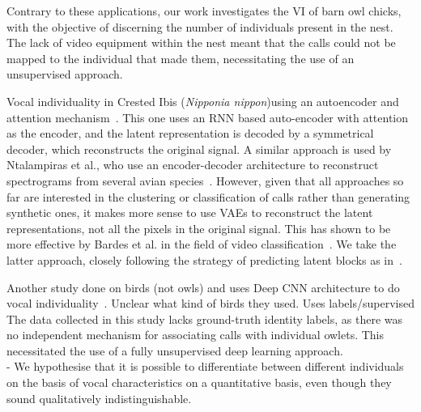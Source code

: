 Contrary to these applications, our work investigates the VI of barn owl chicks, with the objective of discerning the number of individuals present in the nest. The lack of video equipment within the nest meant that the calls could not be mapped to the individual that made them, necessitating the use of an unsupervised approach.

Vocal individuality in Crested Ibis (\textit{Nipponia nippon})using an autoencoder and attention mechanism~\cite{xieHighAccuracyIndividual2020}. This one uses an RNN based auto-encoder with attention as the encoder, and the latent representation is decoded by a symmetrical decoder, which reconstructs the original signal. A similar approach is used by Ntalampiras et al., who use an encoder-decoder architecture to reconstruct spectrograms from several avian species~\cite{ntalampirasAcousticDetectionUnknown2021}. However, given that all approaches so far are interested in the clustering or classification of calls rather than generating synthetic ones, it makes more sense to use VAEs to reconstruct the latent representations, not all the pixels in the original signal. This has shown to be more effective by Bardes et al. in the field of video classification~\cite{bardesRevisitingFeaturePrediction2024}. We take the latter approach, closely following the strategy of predicting latent blocks as in~\cite{tongVideoMAEMaskedAutoencoders2022}. 

Another study done on birds (not owls) and uses Deep CNN architecture to do vocal individuality~\cite{bedoyaAcousticCensusingIndividual2021}.  Unclear what kind of birds they used. Uses labels/supervised \\

The data collected in this study lacks ground-truth identity labels, as there was no independent mechanism for associating calls with individual owlets. This necessitated the use of a fully unsupervised deep learning approach. \\

- We hypothesise that it is possible to differentiate between different individuals on the basis of vocal characteristics on a quantitative basis, even though they sound qualitatively indistinguishable. 